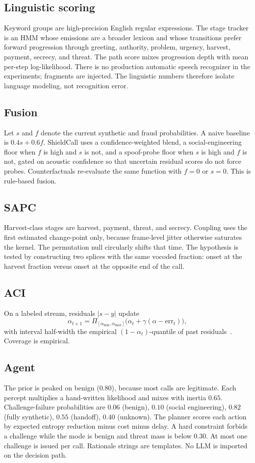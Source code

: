 \documentclass[11pt]{article}
\begin{document}
\subsection{Linguistic scoring}
Keyword groups are high-precision English regular expressions. The stage tracker is an HMM whose emissions are a broader lexicon and whose transitions prefer forward progression through greeting, authority, problem, urgency, harvest, payment, secrecy, and threat. The path score mixes progression depth with mean per-step log-likelihood. There is no production automatic speech recognizer in the experiments; fragments are injected. The linguistic numbers therefore isolate language modeling, not recognition error.

\subsection{Fusion}
Let $s$ and $f$ denote the current synthetic and fraud probabilities. A naive baseline is $0.4s+0.6f$. ShieldCall uses a confidence-weighted blend, a social-engineering floor when $f$ is high and $s$ is not, and a spoof-probe floor when $s$ is high and $f$ is not, gated on acoustic confidence so that uncertain residual scores do not force probes. Counterfactuals re-evaluate the same function with $f=0$ or $s=0$. This is rule-based fusion.

\subsection{SAPC}
Harvest-class stages are harvest, payment, threat, and secrecy. Coupling uses the first estimated change-point only, because frame-level jitter otherwise saturates the kernel. The permutation null circularly shifts that time. The hypothesis is tested by constructing two splices with the same vocoded fraction: onset at the harvest fraction versus onset at the opposite end of the call.

\subsection{ACI}
On a labeled stream, residuals $|s-y|$ update
\[
\alpha_{t+1}=\Pi_{[\alpha_{\min},\alpha_{\max}]}\bigl(\alpha_t+\gamma(\alpha-\mathrm{err}_t)\bigr),
\]
with interval half-width the empirical $(1-\alpha_t)$-quantile of past residuals~\cite{gibbs2021aci}. Coverage is empirical.

\subsection{Agent}
The prior is peaked on benign ($0.80$), because most calls are legitimate. Each percept multiplies a hand-written likelihood and mixes with inertia $0.65$. Challenge-failure probabilities are $0.06$ (benign), $0.10$ (social engineering), $0.82$ (fully synthetic), $0.55$ (handoff), $0.40$ (unknown). The planner scores each action by expected entropy reduction minus cost minus delay. A hard constraint forbids a challenge while the mode is benign and threat mass is below $0.30$. At most one challenge is issued per call. Rationale strings are templates. No LLM is imported on the decision path.
\end{document}
